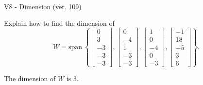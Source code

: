 \begin{exercise}
  \begin{exerciseTitle}V8 - Dimension (ver. 109)\end{exerciseTitle}
  \begin{exerciseStatement}
    Explain how to find the dimension of 
\[W=\mathrm{span}\ \left\{\left[\begin{array}{r}
0 \\
3 \\
-3 \\
-3 \\
-3
\end{array}\right] , \left[\begin{array}{r}
0 \\
-4 \\
1 \\
-3 \\
-3
\end{array}\right] , \left[\begin{array}{r}
1 \\
0 \\
-4 \\
0 \\
-3
\end{array}\right] , \left[\begin{array}{r}
-1 \\
18 \\
-5 \\
3 \\
6
\end{array}\right]\right\}.\]



  \end{exerciseStatement}
  \begin{exerciseAnswer}
   The dimension of \(W\) is  \(3\).
  


  \end{exerciseAnswer}
\end{exercise}
